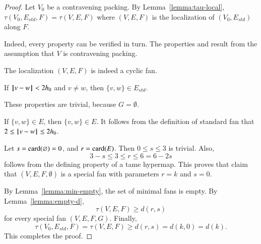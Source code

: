 \begin{proof}
Let $V_0$ be a contravening packing.
By Lemma~\ref{lemma:tau-local}, $\tau(V_0,E_{std},F)=\tau(V,E,F)$  where $(V,E,F)$ is the
localization of
$(V_0,E_{std})$ along $F$. 

  Indeed, every property can be verified in turn.  The properties  and
 result from the assumption that $V$ is contravening
packing.  

  The localization $(V,E,F)$ is indeed a cyclic fan.

  If ${\hskip0.1em|\hskip-0.15em|\hskip0.1em}v - w{\hskip0.1em|\hskip-0.15em|\hskip0.1em}<2{h_0}$ and $v\ne w$, then $\{v,w\}\in E_{std}$.

   These properties are trivial, because $G=\emptyset$.

 If $\{v,w\}\in E$, then $\{v,w\}\in E$.  It follows from the definition of
standard fan that $2\le {\hskip0.1em|\hskip-0.15em|\hskip0.1em}v - w{\hskip0.1em|\hskip-0.15em|\hskip0.1em}\le 2{h_0}$.

 Let $s={\operatorname{card}}(\varnothing) = 0$, and $r={\operatorname{card}}(E)$.  Then $0\le s\le 3$ is trivial. Also, 
$$3-s \le 3\le r \le 6=6 - 2s$$
follows from the defining property  of a tame hypermap.  This proves that claim that
$(V,E,F,\emptyset)$ is a special fan with parameters $r=k$ and $s=0$.

By Lemma~\ref{lemma:min-empty}, the set of minimal fans is empty.
By Lemma~\ref{lemma:empty-d}, 
$$
\tau(V,E,F) \ge d (r,s)
$$
for every special fan $(V,E,F,G)$. 
Finally, 
$$\tau(V_0,E_{std},F)=\tau(V,E,F) \ge d(r,s) = d(k,0) = d(k).$$  
This completes the proof.  
\end{proof}

